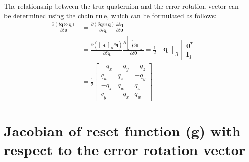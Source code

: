 The relationship between the true quaternion and the error rotation vector can be determined using the chain rule, which can be formulated as follows:
\begin{equation}
\begin{aligned}
    \frac{\partial(\delta\mathbf{q}\otimes\mathbf{q})}{\partial\delta\boldsymbol{\theta}} &=
    \frac{\partial(\delta\mathbf{q}\otimes\mathbf{q})}{\partial\delta\mathbf{q}}
    \frac{\partial\delta\mathbf{q}}{\partial\delta\boldsymbol{\theta}} \\
    &= \frac{\partial\left(\begin{bmatrix}
        \mathbf{q}
    \end{bmatrix}_R \delta\mathbf{q}\right)}{\partial\delta\mathbf{q}}
    \frac{\partial\begin{bmatrix}
        1 \\ \frac{1}{2}\delta\boldsymbol{\theta}
    \end{bmatrix}}{\partial\delta\boldsymbol{\theta}}=\frac{1}{2}\begin{bmatrix}
        \mathbf{q}
    \end{bmatrix}_R\begin{bmatrix}
        \mathbf{0}^T \\ \mathbf{I}_3 
    \end{bmatrix} \\
    &=\frac{1}{2}\begin{bmatrix}
        -q_x & -q_y & -q_z \\
        q_w & q_z & -q_y \\
        -q_z & q_w & q_x \\
        q_y & -q_x & q_w
    \end{bmatrix}
\end{aligned}
\end{equation}


\section{Jacobian of reset function (g) with respect to the error rotation vector}
\label{app:der-g-by-rotvec}

